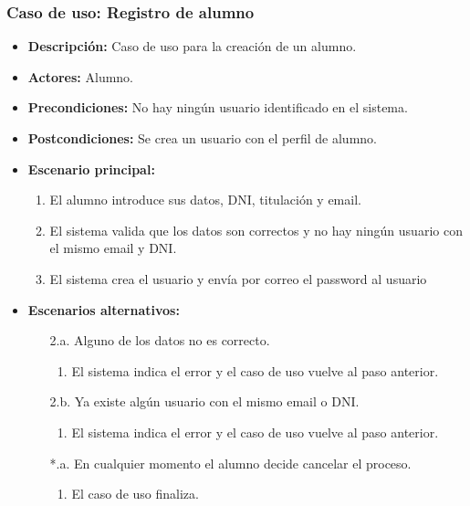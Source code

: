 \subsubsection*{Caso de uso: Registro de alumno}
\label{add_alumno}
\begin{itemize}
\item{\bf Descripción:} Caso de uso para la creación de un alumno.
\item{\bf Actores:} Alumno.
\item{\bf Precondiciones:} No hay ningún usuario identificado en el sistema.
\item{\bf Postcondiciones:} Se crea un usuario con el perfil de alumno.
\item{\bf Escenario principal:}
\begin{enumerate}
\item El alumno introduce sus datos, DNI, titulación y email.
\item El sistema valida que los datos son correctos y no hay ningún usuario con el mismo email y DNI.
\item El sistema crea el usuario y envía por correo el password al usuario
\end{enumerate}
\item{\bf Escenarios alternativos:}
\begin{itemize}
\item[2.a.] Alguno de los datos no es correcto.
\begin{enumerate}
\item El sistema indica el error y el caso de uso vuelve al paso anterior.
\end{enumerate}
\item[2.b.] Ya existe algún usuario con el mismo email o DNI.
\begin{enumerate}
\item El sistema indica el error y el caso de uso vuelve al paso anterior.
\end{enumerate}
\item[*.a.] En cualquier momento el alumno decide cancelar el proceso.
\begin{enumerate}
\item El caso de uso finaliza.
\end{enumerate}
\end{itemize}
\end{itemize}

